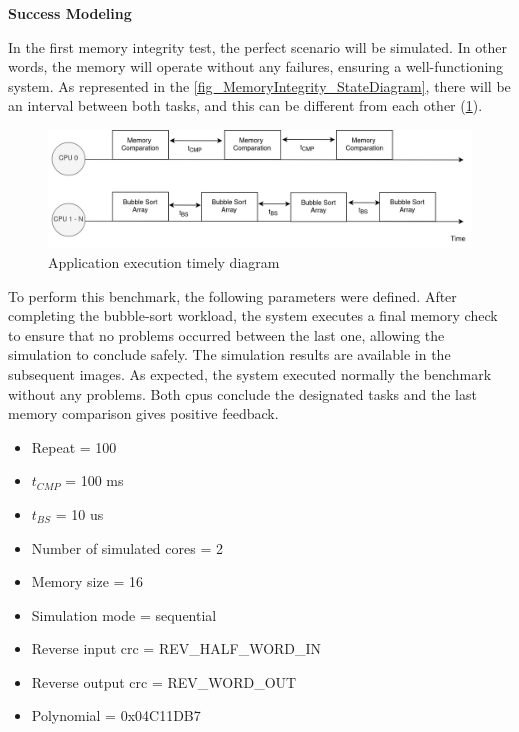 \textbf{Success Modeling}
\newline

In the first memory integrity test, the perfect scenario will be simulated. In other words, the memory will operate without any failures, 
ensuring a well-functioning system. As represented in the \autoref{fig_MemoryIntegrity_StateDiagram}, there will be an interval between both 
tasks, and this can be different from each other (\ref{fig_AppTimeDiagram}). 

\begin{figure}[H]
	\centering
 	\includegraphics[width=0.8\linewidth]{Images/AppTimeDiagram.png}
 	\caption{Application execution timely diagram}
	 \label{fig_AppTimeDiagram}
\end{figure}


To perform this benchmark, the following parameters were defined. After completing the bubble-sort workload, the system executes a final 
memory check to ensure that no problems occurred between the last one, allowing the simulation to conclude safely. The simulation results are 
available in the subsequent images. As expected, the system executed normally the benchmark without any problems. Both \glspl{cpu} conclude the 
designated tasks and the last memory comparison gives positive feedback. 

\hspace{1.5cm}

\begin{multicols}{2}
	
	\begin{itemize}
		\item Repeat = 100
		\item $t_{CMP}$ = 100 ms
		\item $t_{BS}$ = 10 us
		\item Number of simulated cores = 2
		\item Memory size = 16
	\end{itemize}

	\columnbreak

	\begin{itemize}
		\item Simulation mode = sequential
		\item Reverse input \gls{crc} = REV\_HALF\_WORD\_IN
		\item Reverse output \gls{crc} = REV\_WORD\_OUT
		\item Polynomial = 0x04C11DB7
	\end{itemize}

\end{multicols}


